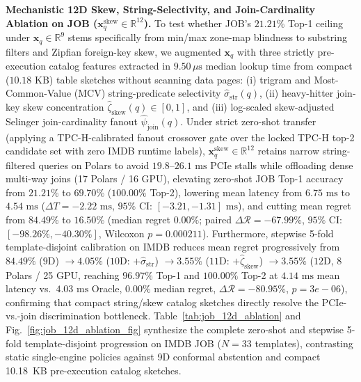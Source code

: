 \documentclass[10pt,a4paper]{article}
\begin{document}
\begin{enumerate}[leftmargin=1.5em,itemsep=2pt]
\textbf{Mechanistic 12D Skew, String-Selectivity, and Join-Cardinality Ablation on JOB ($\mathbf{x}_q^{\text{skew}} \in \mathbb{R}^{12}$).} To test whether JOB's $21.21\%$ Top-1 ceiling under $\mathbf{x}_q \in \mathbb{R}^{9}$ stems specifically from min/max zone-map blindness to substring filters and Zipfian foreign-key skew, we augmented $\mathbf{x}_q$ with three strictly pre-execution catalog features extracted in $9.50\,\mu\text{s}$ median lookup time from compact ($10.18\text{ KB}$) table sketches without scanning data pages: (i) trigram and Most-Common-Value (MCV) string-predicate selectivity $\hat{\sigma}_{\text{str}}(q)$, (ii) heavy-hitter join-key skew concentration $\hat{\zeta}_{\text{skew}}(q) \in [0,1]$, and (iii) log-scaled skew-adjusted Selinger join-cardinality fanout $\hat{\psi}_{\text{join}}(q)$. Under strict zero-shot transfer (applying a TPC-H-calibrated fanout crossover gate over the locked TPC-H top-2 candidate set with zero IMDB runtime labels), $\mathbf{x}_q^{\text{skew}} \in \mathbb{R}^{12}$ retains narrow string-filtered queries on Polars to avoid $19.8\text{--}26.1\text{ ms}$ PCIe stalls while offloading dense multi-way joins (17 Polars / 16 GPU), elevating zero-shot JOB Top-1 accuracy from $21.21\%$ to $69.70\%$ ($100.00\%$ Top-2), lowering mean latency from $6.75\text{ ms}$ to $4.54\text{ ms}$ ($\Delta T = -2.22\text{ ms}$, $95\%$ CI: $[-3.21, -1.31]\text{ ms}$), and cutting mean regret from $84.49\%$ to $16.50\%$ (median regret $0.00\%$; paired $\Delta\mathcal{R} = -67.99\%$, $95\%$ CI: $[-98.26\%, -40.30\%]$, Wilcoxon $p = 0.000211$). Furthermore, stepwise 5-fold template-disjoint calibration on IMDB reduces mean regret progressively from $84.49\%$ ($9\text{D}$) $\rightarrow 4.05\%$ ($10\text{D}$: $+\hat{\sigma}_{\text{str}}$) $\rightarrow 3.55\%$ ($11\text{D}$: $+\hat{\zeta}_{\text{skew}}$) $\rightarrow 3.55\%$ ($12\text{D}$, 8 Polars / 25 GPU, reaching $96.97\%$ Top-1 and $100.00\%$ Top-2 at $4.14\text{ ms}$ mean latency vs.\ $4.03\text{ ms}$ Oracle, $0.00\%$ median regret, $\Delta\mathcal{R} = -80.95\%$, $p = 3e-06$), confirming that compact string/skew catalog sketches directly resolve the PCIe-vs.-join discrimination bottleneck. Table~\ref{tab:job_12d_ablation} and Fig.~\ref{fig:job_12d_ablation_fig} synthesize the complete zero-shot and stepwise 5-fold template-disjoint progression on IMDB JOB ($N=33$ templates), contrasting static single-engine policies against 9D conformal abstention and compact 10.18~KB pre-execution catalog sketches.


\end{enumerate}
\end{document}
